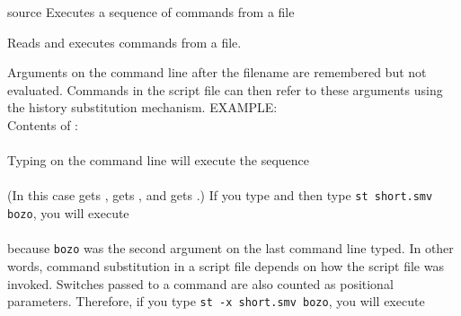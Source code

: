 \begin{nusmvCommand} {source} {Executes a sequence of commands from a file}


Reads and executes commands from a file.

\begin{cmdOpt}



\end{cmdOpt}

Arguments on the command line after the filename are remembered but
not evaluated.  Commands in the script file can then refer to these
arguments using the history substitution mechanism.  EXAMPLE: \\
Contents of :\\
  
\\
Typing  on the command line will execute the
  sequence\\
 
\\
(In this case   gets ,  gets
  , and   gets .)
  If you type  and then type \texttt{st short.smv bozo},
  you will execute\\
 
 \\
  because \texttt{bozo} was the second argument on the last command line typed.  In
  other words, command substitution in a script file depends on how the script
  file was invoked. Switches passed to a command are also counted as
  positional parameters. Therefore, if you type \texttt{st -x short.smv bozo},
  you will execute\\
 

\end{nusmvCommand}
